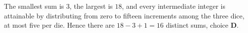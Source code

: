 The smallest sum is $3$, the largest is $18$, and every intermediate integer is attainable by distributing from zero to fifteen increments among the three dice, at most five per die. Hence there are $18-3+1=\boxed{16}$ distinct sums, choice \textbf{D}.
